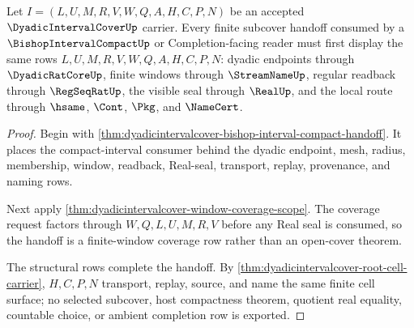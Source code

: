 \begin{theorem}
\label{thm:dyadicintervalcover-subcover-handoff-obligation}
Let $I=(L,U,M,R,V,W,Q,A,H,C,P,N)$ be an accepted $\DyadicIntervalCoverUp$ carrier. Every finite subcover handoff consumed by a $\BishopIntervalCompactUp$ or Completion-facing reader must first display the same rows $L,U,M,R,V,W,Q,A,H,C,P,N$: dyadic endpoints through $\DyadicRatCoreUp$, finite windows through $\StreamNameUp$, regular readback through $\RegSeqRatUp$, the visible seal through $\RealUp$, and the local route through $\hsame$, $\Cont$, $\Pkg$, and $\NameCert$.
\end{theorem}
\begin{proof}
Begin with \autoref{thm:dyadicintervalcover-bishop-interval-compact-handoff}. It places the compact-interval consumer behind the dyadic endpoint, mesh, radius, membership, window, readback, Real-seal, transport, replay, provenance, and naming rows.

Next apply \autoref{thm:dyadicintervalcover-window-coverage-scope}. The coverage request factors through $W,Q,L,U,M,R,V$ before any Real seal is consumed, so the handoff is a finite-window coverage row rather than an open-cover theorem.

The structural rows complete the handoff. By \autoref{thm:dyadicintervalcover-root-cell-carrier}, $H,C,P,N$ transport, replay, source, and name the same finite cell surface; no selected subcover, host compactness theorem, quotient real equality, countable choice, or ambient completion row is exported.
\end{proof}

